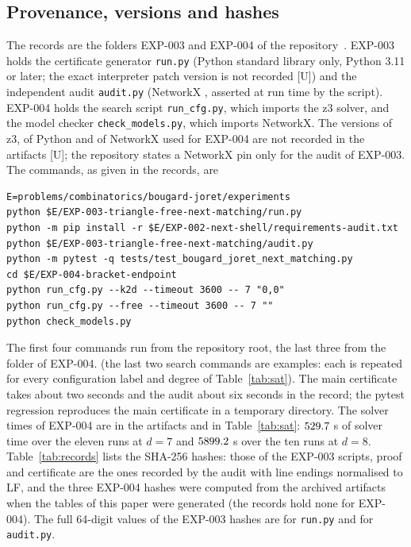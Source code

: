 \documentclass[11pt]{article}
\theoremstyle{remark}
\begin{document}
\subsection{Provenance, versions and hashes}\label{sec:prov}

The records are the folders EXP-003 and EXP-004 of the repository~\cite{Record,Record4}. EXP-003 holds the certificate generator \texttt{run.py} (Python standard library only, Python 3.11 or later; the exact interpreter patch version is not recorded [U]) and the independent audit \texttt{audit.py} (NetworkX \nxVersion, asserted at run time by the script). EXP-004 holds the search script \texttt{run\_cfg.py}, which imports the z3 solver, and the model checker \texttt{check\_models.py}, which imports NetworkX. The versions of z3, of Python and of NetworkX used for EXP-004 are not recorded in the artifacts [U]; the repository states a NetworkX pin only for the audit of EXP-003. The commands, as given in the records, are
\begin{verbatim}
E=problems/combinatorics/bougard-joret/experiments
python $E/EXP-003-triangle-free-next-matching/run.py
python -m pip install -r $E/EXP-002-next-shell/requirements-audit.txt
python $E/EXP-003-triangle-free-next-matching/audit.py
python -m pytest -q tests/test_bougard_joret_next_matching.py
cd $E/EXP-004-bracket-endpoint
python run_cfg.py --k2d --timeout 3600 -- 7 "0,0"
python run_cfg.py --free --timeout 3600 -- 7 ""
python check_models.py
\end{verbatim}
The first four commands run from the repository root, the last three from the folder of EXP-004.
(the last two search commands are examples: each is repeated for every configuration label and degree of Table~\ref{tab:sat}). The main certificate takes about two seconds and the audit about six seconds in the record; the pytest regression reproduces the main certificate in a temporary directory. The solver times of EXP-004 are in the artifacts and in Table~\ref{tab:sat}: $529.7$ s of solver time over the eleven runs at $d=7$ and $5899.2$ s over the ten runs at $d=8$. Table~\ref{tab:records} lists the SHA-256 hashes: those of the EXP-003 scripts, proof and certificate are the ones recorded by the audit with line endings normalised to LF, and the three EXP-004 hashes were computed from the archived artifacts when the tables of this paper were generated (the records hold none for EXP-004). The full 64-digit values of the EXP-003 hashes are \texttt{\hashRun} for \texttt{run.py} and \texttt{\hashAudit} for \texttt{audit.py}.
\end{document}
